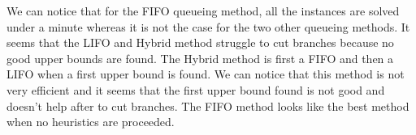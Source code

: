 We can notice that for the FIFO queueing method, all the instances are solved under a minute whereas it is not the case for the two other queueing methods. It seems that the LIFO and Hybrid method struggle to cut branches because no good upper bounds are found. The Hybrid method is first a FIFO and then a LIFO when a first upper bound is found. We can notice that this method is not very efficient and it seems that the first upper bound found is not good and doesn't help after to cut branches. The FIFO method looks like the best method when no heuristics are proceeded.